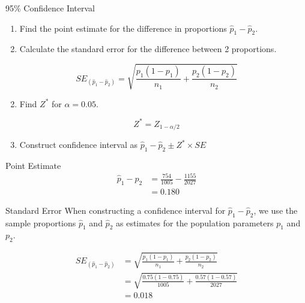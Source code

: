 \documentclass[
  ignorenonframetext,
]{beamer}
\providecommand{\tightlist}{%
  \setlength{\itemsep}{0pt}\setlength{\parskip}{0pt}}\usepackage{longtable,booktabs,array}
\begin{document}
\begin{frame}{95\% Confidence Interval}
\label{confidence-interval-1}
\begin{enumerate}
\tightlist
\item
  Find the point estimate for the difference in proportions
  \(\hat{p}_1-\hat{p}_2\).
\end{enumerate}

\pause

\begin{enumerate}
\setcounter{enumi}{1}
\tightlist
\item
  Calculate the standard error for the difference between 2 proportions.
\end{enumerate}

\[
SE_{(\hat{p}_1-\hat{p}_2)}=\sqrt{\frac{p_1(1-p_1)}{n_1}+\frac{p_2(1-p_2)}{n_2}}
\]

\pause

\begin{enumerate}
\setcounter{enumi}{1}
\tightlist
\item
  Find \(Z^*\) for \(\alpha = 0.05\).
\end{enumerate}

\[
Z^*=Z_{1-\alpha/2}
\]

\pause

\begin{enumerate}
\setcounter{enumi}{2}
\tightlist
\item
  Construct confidence interval as
  \(\hat{p}_1 - \hat{p}_2 \pm Z^* \times SE\)
\end{enumerate}
\end{frame}

\begin{frame}{Point Estimate}
\label{point-estimate}
\[
\begin{aligned}
\hat{p}_1-\hat{p}_2&=\frac{754}{1005}-\frac{1155}{2027} \\
&= 0.180
\end{aligned}
\]
\end{frame}

\begin{frame}{Standard Error}
\label{standard-error-2}
When constructing a confidence interval for \(\hat{p}_1-\hat{p}_2\), we
use the sample proportions \(\hat{p}_1\) and \(\hat{p}_2\) as estimates
for the population parameters \(p_1\) and \(p_2\).

\pause

\[
\begin{aligned}
SE_{(\hat{p}_1-\hat{p}_2)}&=\sqrt{\frac{p_1(1-p_1)}{n_1}+\frac{p_2(1-p_2)}{n_2}} \\
&=\sqrt{\frac{0.75(1-0.75)}{1005}+\frac{0.57(1-0.57)}{2027}} \\
&=0.018
\end{aligned}
\]
\end{frame}
\end{document}
